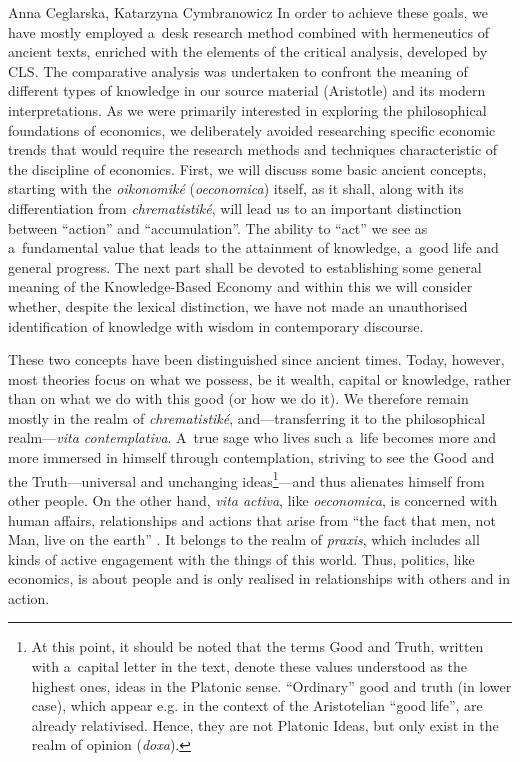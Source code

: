 \begin{artengenv2auth}{Anna Ceglarska, Katarzyna Cymbranowicz}
In order to achieve these goals, we have mostly employed a~desk research method combined with hermeneutics of ancient texts, enriched with the elements of the critical analysis, developed by CLS. The comparative analysis was undertaken to confront the meaning of different types of knowledge in our source material (Aristotle) and its modern interpretations. As we were primarily interested in exploring the philosophical foundations of economics, we deliberately avoided researching specific economic trends that would require the research methods and techniques characteristic of the discipline of economics. First, we will discuss some basic ancient concepts, starting with the \textit{oikonomiké} (\textit{oeconomica}) itself, as it shall, along with its differentiation from \textit{chrematistiké}, will lead us to an important distinction between ``action'' and ``accumulation''. The ability to ``act'' we see as a~fundamental value that leads to the attainment of knowledge, a~good life and general progress. The next part shall be devoted to establishing some general meaning of the Knowledge-Based Economy and within this we will consider whether, despite the lexical distinction, we have not made an unauthorised identification of knowledge with wisdom in contemporary discourse.



These two concepts have been distinguished since ancient times. Today, however, most theories focus on what we possess, be it wealth, capital or knowledge, rather than on what we do with this good (or how we do it). We therefore remain mostly in the realm of \textit{chrematistiké}, and---transferring it to the philosophical realm---\textit{vita contemplativa}. A~true sage who lives such a~life becomes more and more immersed in himself through contemplation, striving to see the Good and the Truth---universal and unchanging ideas\footnote{At this point, it should be noted that the terms Good and Truth, written with a~capital letter in the text, denote these values understood as the highest ones, ideas in the Platonic sense. ``Ordinary'' good and truth (in lower case), which appear e.g. in the context of the Aristotelian ``good life'', are already relativised. Hence, they are not Platonic Ideas, but only exist in the realm of opinion (\textit{doxa}).}---and thus alienates himself from other people. On the other hand, \textit{vita activa}, like \textit{oeconomica}, is concerned with human affairs, relationships and actions that arise from ``the fact that men, not Man, live on the earth'' 
\parencite[][p.7]{arendt_human_1998}. %
 It belongs to the realm of \textit{praxis}, which includes all kinds of active engagement with the things of this world. Thus, politics, like economics, is about people and is only realised in relationships with others and in action.




\end{artengenv2auth}
